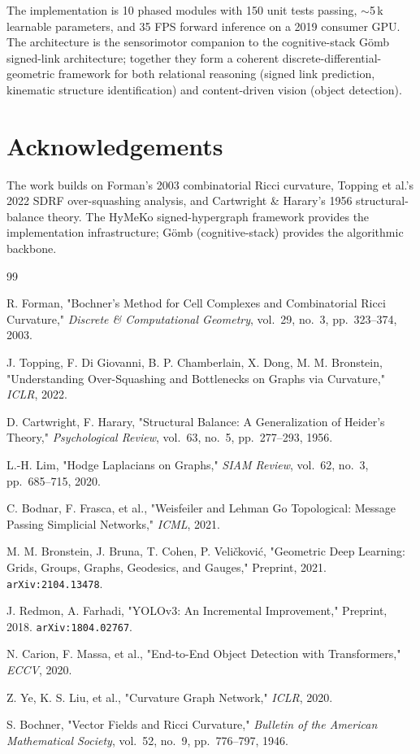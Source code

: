 \documentclass[11pt,a4paper]{article}
\newcommand{\Gomb}{G\"omb}
\begin{document}
The implementation is 10 phased modules with 150 unit tests
passing, $\sim$5\,k learnable parameters, and 35 FPS forward
inference on a 2019 consumer GPU. The architecture is the
sensorimotor companion to the cognitive-stack \Gomb{} signed-link
architecture; together they form a coherent
discrete-differential-geometric framework for both relational
reasoning (signed link prediction, kinematic structure
identification) and content-driven vision (object detection).

\section*{Acknowledgements}

The work builds on Forman's 2003 combinatorial Ricci curvature,
Topping et al.'s 2022 SDRF over-squashing analysis, and
Cartwright \& Harary's 1956 structural-balance theory. The
HyMeKo signed-hypergraph framework provides the implementation
infrastructure; \Gomb{} (cognitive-stack) provides the algorithmic
backbone.

\begin{thebibliography}{99}

R. Forman, "Bochner's Method for Cell Complexes and Combinatorial
Ricci Curvature," \emph{Discrete \& Computational Geometry},
vol.~29, no.~3, pp.~323--374, 2003.

J. Topping, F. Di Giovanni, B. P. Chamberlain, X. Dong, M. M.
Bronstein, "Understanding Over-Squashing and Bottlenecks on Graphs
via Curvature," \emph{ICLR}, 2022.

D. Cartwright, F. Harary, "Structural Balance: A Generalization of
Heider's Theory," \emph{Psychological Review}, vol.~63, no.~5,
pp.~277--293, 1956.

L.-H. Lim, "Hodge Laplacians on Graphs," \emph{SIAM Review},
vol.~62, no.~3, pp.~685--715, 2020.

C. Bodnar, F. Frasca, et al., "Weisfeiler and Lehman Go Topological:
Message Passing Simplicial Networks," \emph{ICML}, 2021.

M. M. Bronstein, J. Bruna, T. Cohen, P. Veličković, "Geometric Deep
Learning: Grids, Groups, Graphs, Geodesics, and Gauges," Preprint,
2021. \texttt{arXiv:2104.13478}.

J. Redmon, A. Farhadi, "YOLOv3: An Incremental Improvement,"
Preprint, 2018. \texttt{arXiv:1804.02767}.

N. Carion, F. Massa, et al., "End-to-End Object Detection with
Transformers," \emph{ECCV}, 2020.

Z. Ye, K. S. Liu, et al., "Curvature Graph Network," \emph{ICLR},
2020.

S. Bochner, "Vector Fields and Ricci Curvature," \emph{Bulletin of
the American Mathematical Society}, vol.~52, no.~9, pp.~776--797,
1946.

\end{thebibliography}
\end{document}
